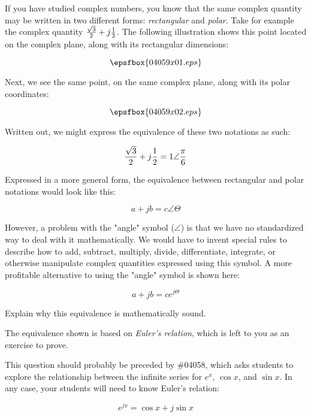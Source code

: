 

If you have studied complex numbers, you know that the same complex quantity may be written in two different forms: {\it rectangular} and {\it polar}.  Take for example the complex quantity ${\sqrt{3} \over 2} + j{1 \over 2}$.  The following illustration shows this point located on the complex plane, along with its rectangular dimensions:

$$\epsfbox{04059x01.eps}$$

\vskip 10pt

Next, we see the same point, on the same complex plane, along with its polar coordinates:

$$\epsfbox{04059x02.eps}$$

\vskip 10pt

Written out, we might express the equivalence of these two notations as such:

$${\sqrt{3} \over 2} + j{1 \over 2} = 1 \angle {\pi \over 6}$$

\vskip 30pt

\goodbreak
Expressed in a more general form, the equivalence between rectangular and polar notations would look like this:

$$a + jb = c \angle \Theta$$

However, a problem with the "angle" symbol ($\angle$) is that we have no standardized way to deal with it mathematically.  We would have to invent special rules to describe how to add, subtract, multiply, divide, differentiate, integrate, or otherwise manipulate complex quantities expressed using this symbol.  A more profitable alternative to using the "angle" symbol is shown here:

$$a + jb = c e^{j\Theta}$$

Explain why this equivalence is mathematically sound.







The equivalence shown is based on {\it Euler's relation}, which is left to you as an exercise to prove.







This question should probably be preceded by \#04058, which asks students to explore the relationship between the infinite series for $e^x$, $\cos x$, and $\sin x$.  In any case, your students will need to know Euler's relation:

$$e^{jx} = \cos x + j \sin x$$




